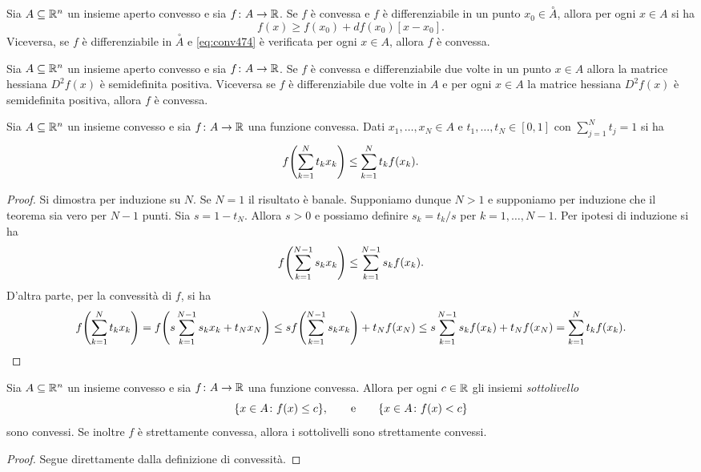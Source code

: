 \begin{theorem}
    Sia $A\subseteq {\mathbb R}^n$ un insieme aperto convesso e sia $f\colon A \to {\mathbb R}$.
    Se $f$ è convessa e $f$ è differenziabile in un punto $x_0 \in \stackrel\circ A$, 
    allora per ogni $x \in A$ si ha
    \begin{equation}\label{eq:conv474}    
        f(x) \ge f(x_0) + df(x_0)[x-x_0].
    \end{equation}
    Viceversa, se $f$ è differenziabile in $\stackrel\circ A$ 
    e \ref{eq:conv474} è verificata per ogni $x \in A$, allora $f$ è convessa.
\end{theorem}
\begin{theorem}
    Sia $A\subseteq {\mathbb R}^n$ un insieme aperto convesso 
    e sia $f\colon A \to {\mathbb R}$.
    Se $f$ è convessa e differenziabile due volte in un punto $x\in A$ 
    allora la matrice hessiana $D^2 f(x)$ è semidefinita positiva.
    Viceversa se $f$ è differenziabile due volte in $A$ 
    e per ogni $x\in A$ la matrice hessiana $D^2 f(x)$ è semidefinita positiva, 
    allora $f$ è convessa.
\end{theorem}


\begin{theorem}
    Sia $A\subseteq {\mathbb R}^n$ un insieme convesso 
    e sia $f\colon A \to {\mathbb R}$ una funzione convessa.
    Dati $x_1,\dots, x_N \in A$ e $t_1,\dots, t_N \in [0,1]$ con $\sum_{j=1}^N t_j = 1$ si ha
    \[
      f{\left( \sum_{k=1}^N t_k x_k \right)} \le \sum_{k=1}^N t_k f(x_k).
    \]
\end{theorem}
\begin{proof}
    Si dimostra per induzione su $N$.
    Se $N=1$ il risultato è banale. 
    Supponiamo dunque $N>1$ e supponiamo per induzione che il teorema sia vero
    per $N-1$ punti.
    Sia $s = 1-t_N$.
    Allora $s > 0$ e possiamo definire $s_k = t_k/s$ per $k=1,\dots, N-1$.
    Per ipotesi di induzione si ha 
    \[
      f{\left( \sum_{k=1}^{N-1} s_k x_k \right)} \le \sum_{k=1}^{N-1} s_k f(x_k).
    \]
    D'altra parte, per la convessità di $f$, si ha 
    \[
      f{\left( \sum_{k=1}^N t_k x_k \right)} = f{\left( s \sum_{k=1}^{N-1} s_k x_k + t_N x_N \right)}
      \le s f{\left( \sum_{k=1}^{N-1} s_k x_k \right)} + t_N f(x_N)
      \le s \sum_{k=1}^{N-1} s_k f(x_k) + t_N f(x_N)
      = \sum_{k=1}^N t_k f(x_k).
    \]
\end{proof}

\begin{theorem}
    Sia $A\subseteq {\mathbb R}^n$ un insieme convesso e sia $f\colon A \to {\mathbb R}$ una funzione convessa.
    Allora per ogni $c\in {\mathbb R}$ gli insiemi \emph{sottolivello}
    \[
        {\left\{ x\in A\colon f(x)\le c \right\}},
        \qquad \text{e} \qquad
        {\left\{ x\in A\colon f(x) < c \right\}}
    \]
    sono convessi.
    Se inoltre $f$ è strettamente convessa, allora i sottolivelli sono strettamente convessi.
\end{theorem}
\begin{proof}
Segue direttamente dalla definizione di convessità.
\end{proof}

